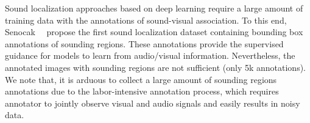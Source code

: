 
Sound localization approaches based on deep learning require a large amount of training data with the annotations of sound-visual association.
%
%
To this end, Senocak~\etal~\cite{av_cvpr18_lls,av_tpami20_lls} propose the first sound localization dataset containing bounding box annotations of sounding regions.
%
These annotations provide the supervised guidance for models to learn from audio/visual information.
% 
Nevertheless, the annotated images with sounding regions are not sufficient (only 5k annotations). 
%
We note that, it is arduous to collect a large amount of sounding regions annotations due to the labor-intensive annotation process, which requires annotator to jointly observe visual and audio signals and easily results in noisy data.
% 
% 

